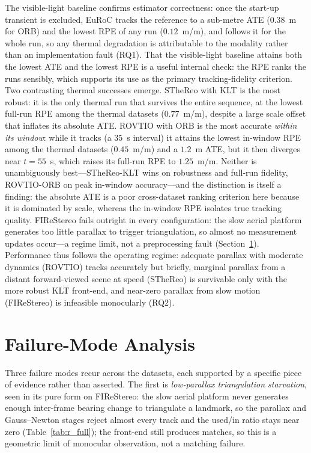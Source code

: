 The visible-light baseline confirms estimator correctness: once the start-up transient is excluded, EuRoC tracks the reference to a sub-metre ATE ($0.38$~m for ORB) and the lowest RPE of any run ($0.12$~m/m), and follows it for the whole run, so any thermal degradation is attributable to the modality rather than an implementation fault (RQ1). That the visible-light baseline attains both the lowest ATE and the lowest RPE is a useful internal check: the RPE ranks the runs sensibly, which supports its use as the primary tracking-fidelity criterion. Two contrasting thermal successes emerge. STheReo with KLT is the most robust: it is the only thermal run that survives the entire sequence, at the lowest full-run RPE among the thermal datasets ($0.77$~m/m), despite a large scale offset that inflates its absolute ATE. ROVTIO with ORB is the most accurate \emph{within its window}: while it tracks (a $35$~s interval) it attains the lowest in-window RPE among the thermal datasets ($0.45$~m/m) and a $1.2$~m ATE, but it then diverges near $t=55$~s, which raises its full-run RPE to $1.25$~m/m. Neither is unambiguously best---STheReo-KLT wins on robustness and full-run fidelity, ROVTIO-ORB on peak in-window accuracy---and the distinction is itself a finding: the absolute ATE is a poor cross-dataset ranking criterion here because it is dominated by scale, whereas the in-window RPE isolates true tracking quality. FIReStereo fails outright in every configuration: the slow aerial platform generates too little parallax to trigger triangulation, so almost no measurement updates occur---a regime limit, not a preprocessing fault (Section~\ref{sec:r_failure}). Performance thus follows the operating regime: adequate parallax with moderate dynamics (ROVTIO) tracks accurately but briefly, marginal parallax from a distant forward-viewed scene at speed (STheReo) is survivable only with the more robust KLT front-end, and near-zero parallax from slow motion (FIReStereo) is infeasible monocularly (RQ2).


\section{Failure-Mode Analysis}
\label{sec:r_failure}
Three failure modes recur across the datasets, each supported by a specific piece of evidence rather than asserted. The first is \emph{low-parallax triangulation starvation}, seen in its pure form on FIReStereo: the slow aerial platform never generates enough inter-frame bearing change to triangulate a landmark, so the parallax and Gauss--Newton stages reject almost every track and the used/in ratio stays near zero (Table~\ref{tab:r_full}); the front-end still produces matches, so this is a geometric limit of monocular observation, not a matching failure.

